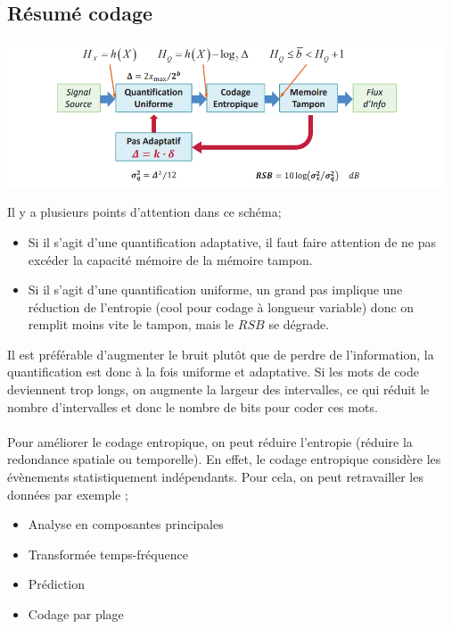 \documentclass[a4paper,12pt,oneside]{report}	%
\begin{document}
            \subsection*{Résumé codage}
                \begin{center}
                    \includegraphics[width=13cm]{LaTeX/pictures/1.1.2_2.png}
                \end{center}
                Il y a plusieurs points d'attention dans ce schéma;
                \begin{itemize}
                    \item Si il s'agit d'une quantification adaptative, il faut faire attention de ne pas excéder la capacité mémoire de la mémoire tampon.
                    \item Si il s'agit d'une quantification uniforme, un grand pas implique une réduction de l'entropie (cool pour codage à longueur variable) donc on remplit moins vite le tampon, mais le $RSB$ se dégrade.
                \end{itemize}
                Il est préférable d'augmenter le bruit plutôt que de perdre de l'information, la quantification est donc à la fois uniforme et adaptative. Si les mots de code deviennent trop longs, on augmente la largeur des intervalles, ce qui réduit le nombre d'intervalles et donc le nombre de bits pour coder ces mots.\\\\
                Pour améliorer le codage entropique, on peut réduire l'entropie (réduire la redondance spatiale ou temporelle). En effet, le codage entropique considère les évènements statistiquement indépendants. Pour cela, on peut retravailler les données par exemple ;
                \begin{itemize}
                    \item Analyse en composantes principales
                    \item Transformée temps-fréquence
                    \item Prédiction
                    \item Codage par plage
                \end{itemize}
\end{document}
